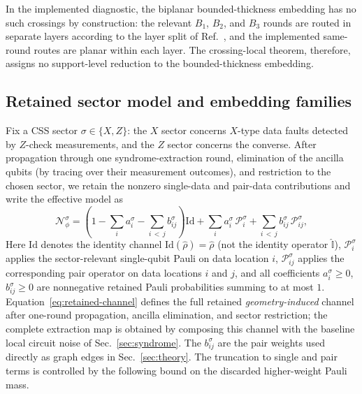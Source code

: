 \documentclass[
aps,
prx,
10pt,
twocolumn,
groupedaddress,
longbibliography,
nofootinbib,
floatfix
]{revtex4-2}
\theoremstyle{definition}
\newcommand{\I}{\hat{\mathbb{I}}}
\begin{document}
In the implemented diagnostic, the biplanar bounded-thickness embedding has no such crossings by construction: the relevant $B_1$, $B_2$, and $B_3$ rounds are routed in separate layers according to the layer split of Ref.~, and the implemented same-round routes are planar within each layer. The crossing-local theorem, therefore, assigns no support-level reduction to the bounded-thickness embedding.

\subsection{Retained sector model and embedding families}

Fix a CSS sector $\sigma\in\{X,Z\}$: the $X$ sector concerns $X$-type data faults detected by $Z$-check measurements, and the $Z$ sector concerns the converse. After propagation through one syndrome-extraction round, elimination of the ancilla qubits (by tracing over their measurement outcomes), and restriction to the chosen sector, we retain the nonzero single-data and pair-data contributions and write the effective model as
\begin{equation}
\mathcal N^{\sigma}_{\phi}=\left(1-\sum_i a_i^{\sigma}-\sum_{i\,<\,j} b_{ij}^{\sigma}\right)\mathrm{Id}+\sum_i a_i^{\sigma}\,\mathcal P_i^{\sigma}+\sum_{i\,<\,j} b_{ij}^{\sigma}\,\mathcal P_{ij}^{\sigma},
\label{eq:retained-channel}
\end{equation}
Here $\mathrm{Id}$ denotes the identity channel $\mathrm{Id}(\hat\rho)=\hat\rho$ (not the identity operator $\I$), $\mathcal P_i^{\sigma}$ applies the sector-relevant single-qubit Pauli on data location $i$, $\mathcal P_{ij}^{\sigma}$ applies the corresponding pair operator on data locations $i$ and $j$, and all coefficients $a_i^{\sigma}\ge 0$, $b_{ij}^{\sigma}\ge 0$ are nonnegative retained Pauli probabilities summing to at most $1$. Equation~\eqref{eq:retained-channel} defines the full retained \emph{geometry-induced} channel after one-round propagation, ancilla elimination, and sector restriction; the complete extraction map is obtained by composing this channel with the baseline local circuit noise of Sec.~\ref{sec:syndrome}. The $b_{ij}^{\sigma}$ are the pair weights used directly as graph edges in Sec.~\ref{sec:theory}. The truncation to single and pair terms is controlled by the following bound on the discarded higher-weight Pauli mass.
\end{document}
